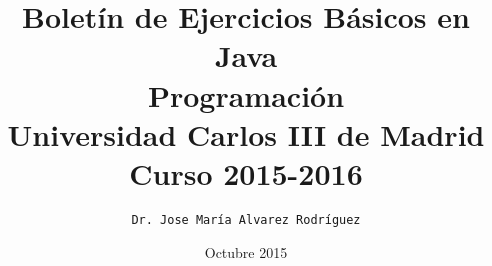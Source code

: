 \documentclass[a4paper,12pt]{book}
\begin{document}
\author{\texttt{Dr. Jose María Alvarez Rodríguez}}
\title{\textbf{Boletín de Ejercicios Básicos en Java} \\ Programación \\ Universidad Carlos III de Madrid\\ {\footnotesize Curso 2015-2016}}
\date{Octubre 2015}

\frontmatter
\maketitle
\tableofcontents
\lstlistoflistings

\mainmatter




\backmatter
\end{document}
